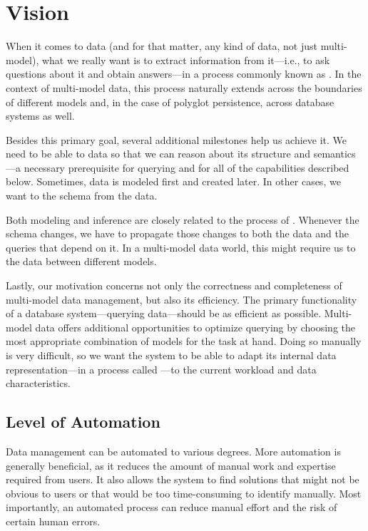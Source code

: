 \section{Vision}
\label{sec:vision}

When it comes to data (and for that matter, any kind of data, not just multi-model), what we really want is to extract information from it---i.e., to ask questions about it and obtain answers---in a process commonly known as . In the context of multi-model data, this process naturally extends across the boundaries of different models and, in the case of polyglot persistence, across database systems as well.

Besides this primary goal, several additional milestones help us achieve it. We need to be able to  data so that we can reason about its structure and semantics---a necessary prerequisite for querying and for all of the capabilities described below. Sometimes, data is modeled first and created later. In other cases, we want to  the schema from the data.

Both modeling and inference are closely related to the process of . Whenever the schema changes, we have to propagate those changes to both the data and the queries that depend on it. In a multi-model data world, this might require us to  the data between different models.

Lastly, our motivation concerns not only the correctness and completeness of multi-model data management, but also its efficiency. The primary functionality of a database system---querying data---should be as efficient as possible. Multi-model data offers additional opportunities to optimize querying by choosing the most appropriate combination of models for the task at hand. Doing so manually is very difficult, so we want the system to be able to adapt its internal data representation---in a process called ---to the current workload and data characteristics.

\subsection{Level of Automation}
\label{sec:vision-automation}

Data management can be automated to various degrees. More automation is generally beneficial, as it reduces the amount of manual work and expertise required from users. It also allows the system to find solutions that might not be obvious to users or that would be too time-consuming to identify manually. Most importantly, an automated process can reduce manual effort and the risk of certain human errors.

